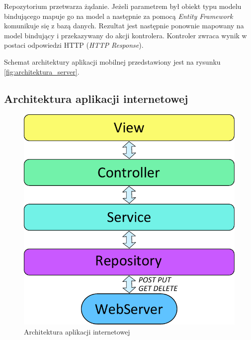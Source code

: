 \documentclass{book}
\begin{document}
			Repozytorium przetwarza żądanie. Jeżeli parametrem był obiekt typu modelu bindującego mapuje go na model a następnie za pomocą \emph{Entity Framework} komunikuje się z bazą danych. Rezultat jest następnie ponownie mapowany na model bindujący i przekazywany do akcji kontrolera. Kontroler zwraca wynik w postaci odpowiedzi HTTP (\emph{HTTP Response}).
			
			Schemat architektury aplikacji mobilnej przedstawiony jest na rysunku \ref{fig:architektura_server}. 
			
			
			\subsection{Architektura aplikacji internetowej}		
			
			\begin{figure}
				\centering
				\includegraphics[width=1\textwidth]{architektura_webapp.pdf}
				\caption{Architektura aplikacji internetowej}
				\label{fig:architektura_webapp}
			\end{figure}
\end{document}
